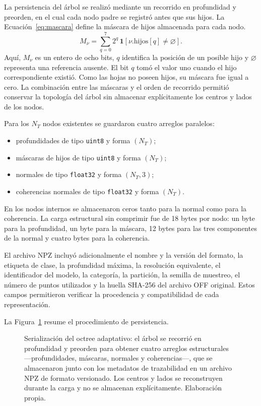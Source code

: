 La persistencia del árbol se realizó mediante un recorrido en profundidad y preorden, en el cual cada nodo padre se registró antes que sus hijos. La Ecuación~\eqref{eq:mascara} define la máscara de hijos almacenada para cada nodo.
\begin{equation}
M_\nu
=
\sum_{q=0}^{7}
2^q\,
\mathbf{1}
\left[
\nu.\mathrm{hijos}[q]\neq\varnothing
\right].
\label{eq:mascara}
\end{equation}
Aquí, $M_\nu$ es un entero de ocho bits, $q$ identifica la posición de un posible hijo y $\varnothing$ representa una referencia ausente. El bit $q$ tomó el valor uno cuando el hijo correspondiente existió. Como las hojas no poseen hijos, su máscara fue igual a cero. La combinación entre las máscaras y el orden de recorrido permitió conservar la topología del árbol sin almacenar explícitamente los centros y lados de los nodos.

Para los $N_T$ nodos existentes se guardaron cuatro arreglos paralelos:

\begin{itemize}
    \item profundidades de tipo \texttt{uint8} y forma $(N_T)$;
    \item máscaras de hijos de tipo \texttt{uint8} y forma $(N_T)$;
    \item normales de tipo \texttt{float32} y forma $(N_T,3)$;
    \item coherencias normales de tipo \texttt{float32} y forma $(N_T)$.
\end{itemize}

En los nodos internos se almacenaron ceros tanto para la normal como para la coherencia. La carga estructural sin comprimir fue de 18 bytes por nodo: un byte para la profundidad, un byte para la máscara, 12 bytes para las tres componentes de la normal y cuatro bytes para la coherencia.

El archivo NPZ incluyó adicionalmente el nombre y la versión del formato, la etiqueta de clase, la profundidad máxima, la resolución equivalente, el identificador del modelo, la categoría, la partición, la semilla de muestreo, el número de puntos utilizados y la huella SHA-256 del archivo OFF original. Estos campos permitieron verificar la procedencia y compatibilidad de cada representación.

La Figura~\ref{fig:serializacion} resume el procedimiento de persistencia.
\begin{figure}[H]
\centering
{}
\caption{Serialización del octree adaptativo: el árbol se recorrió en profundidad y preorden para obtener cuatro arreglos estructurales ---profundidades, máscaras, normales y coherencias---, que se almacenaron junto con los metadatos de trazabilidad en un archivo NPZ de formato versionado. Los centros y lados se reconstruyen durante la carga y no se almacenan explícitamente. Elaboración propia.}
\label{fig:serializacion}
\end{figure}

